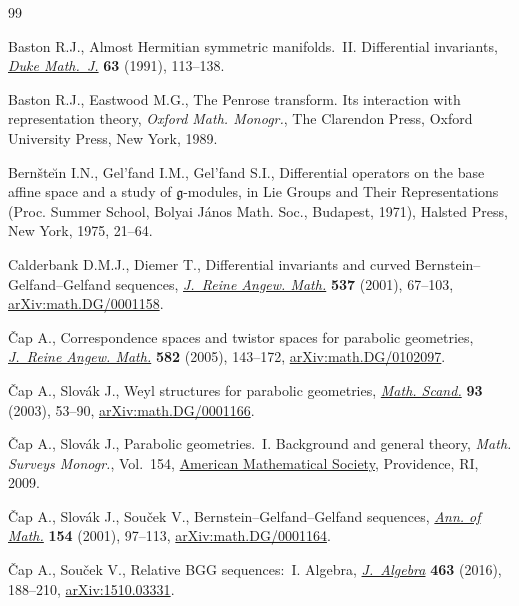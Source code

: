 \documentclass[10pt,a4paper]{amsart}
\numberwithin{equation}{section}
\begin{document}
\begin{thebibliography}{99}
\footnotesize\itemsep=0pt

Baston R.J., Almost {H}ermitian symmetric manifolds.~{II}. {D}ifferential
 invariants, \href{https://doi.org/10.1215/S0012-7094-91-06306-4}{\textit{Duke Math.~J.}} \textbf{63} (1991), 113--138.

Baston R.J., Eastwood M.G., The {P}enrose transform. Its interaction with
 representation theory, \textit{Oxford Math. Monogr.}, The Clarendon Press, Oxford
 University Press, New York, 1989.

Bern\v{s}te\u{\i}n I.N., Gel'fand I.M., Gel'fand S.I., Differential operators
 on the base affine space and a study of {$\mathfrak{g}$}-modules, in Lie
 Groups and Their Representations ({P}roc. {S}ummer {S}chool, {B}olyai
 {J}\'anos {M}ath. {S}oc., {B}udapest, 1971), Halsted Press, New York, 1975,
 21--64.

Calderbank D.M.J., Diemer T., Differential invariants and curved
 {B}ernstein--{G}elfand--{G}elfand sequences, \href{https://doi.org/10.1515/crll.2001.059}{\textit{J.~Reine Angew. Math.}}
 \textbf{537} (2001), 67--103, \href{https://arxiv.org/abs/math.DG/0001158}{arXiv:math.DG/0001158}.

{\v{C}}ap A., Correspondence spaces and twistor spaces for parabolic
 geometries, \href{https://doi.org/10.1515/crll.2005.2005.582.143}{\textit{J.~Reine Angew. Math.}} \textbf{582} (2005), 143--172,
 \href{https://arxiv.org/abs/math.DG/0102097}{arXiv:math.DG/0102097}.

{\v{C}}ap A., Slov\'ak J., Weyl structures for parabolic geometries,
 \href{https://doi.org/10.7146/math.scand.a-14413}{\textit{Math. Scand.}} \textbf{93} (2003), 53--90, \href{https://arxiv.org/abs/math.DG/0001166}{arXiv:math.DG/0001166}.

{\v{C}}ap A., Slov\'ak J., Parabolic geometries.~{I}. Background and general
 theory, \textit{Math. Surveys Monogr.}, Vol.~154, \href{https://doi.org/10.1090/surv/154}{American Mathematical
 Society}, Providence, RI, 2009.

{\v{C}}ap A., Slov\'ak J., Sou\v{c}ek V., Bernstein--{G}elfand--{G}elfand
 sequences, \href{https://doi.org/10.2307/3062111}{\textit{Ann. of Math.}} \textbf{154} (2001), 97--113,
 \href{https://arxiv.org/abs/math.DG/0001164}{arXiv:math.DG/0001164}.

{\v{C}}ap A., Sou\v{c}ek V., Relative {BGG} sequences:~{I}. {A}lgebra,
 \href{https://doi.org/10.1016/j.jalgebra.2016.06.007}{\textit{J.~Algebra}} \textbf{463} (2016), 188--210, \href{https://arxiv.org/abs/1510.03331}{arXiv:1510.03331}.


\end{thebibliography}
\end{document}
